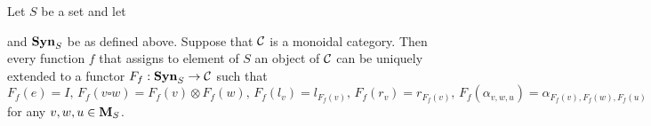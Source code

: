 \begin{proposition}\label{proposition:syntactictensorcategory}
Let $S$ be a set and let
\begin{center}
\end{center}
and $\mathbf{Syn}_{S}$ be as defined above. Suppose that ${\mathcal C}$ is a monoidal category. Then every function $f$ that assigns to element of $S$ an object of ${\mathcal C}$ can be uniquely extended to a functor $F_f:\mathbf{Syn}_{S} \rightarrow {\mathcal C}$ such that 
$$F_f(e) = I,\,F_f(v\square w) = F_f(v)\otimes F_f(w),\,F_f(l_v) = l_{F_f(v)},\,F_f(r_v) = r_{F_f(v)},\,F_f(\alpha_{v,w,u}) = \alpha_{F_f(v),F_f(w),F_f(u)}$$
for any $v,w,u\in \mathbf{M}_S$.
\end{proposition}
